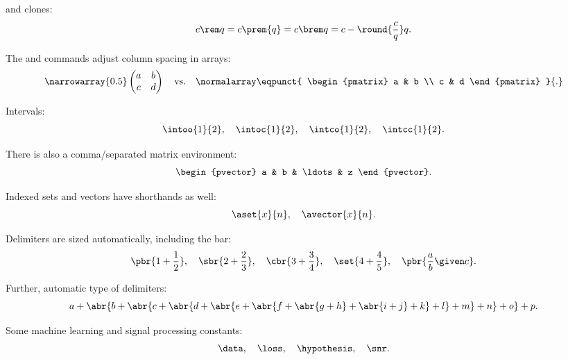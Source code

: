 \noindent
and \latexinline{\mod} clones:
\begin{equation*}
  c \rem q = c \prem{q} = c \brem q = c - \round{\frac{c}{q}}q.
\end{equation*}

The  and  commands adjust column spacing in arrays:
\begin{equation*}
  \narrowarray{0.5}
  \begin{pmatrix}
    a & b \\
    c & d
  \end{pmatrix}
  \quad \text{vs.} \quad
  \normalarray
  \eqpunct{
    \begin{pmatrix}
      a & b \\
      c & d
    \end{pmatrix}
  }{.}
\end{equation*}

Intervals:
\begin{equation*}
  \intoo{1}{2},
  \quad \intoc{1}{2},
  \quad \intco{1}{2},
  \quad \intcc{1}{2}.
\end{equation*}

\noindent
There is also a comma\-/separated matrix environment:
\begin{equation*}
  \begin{pvector}
    a & b & \ldots & z
  \end{pvector}.
\end{equation*}

\noindent
Indexed sets and vectors have shorthands as well:
\begin{equation*}
  \aset{x}{n},
  \quad \avector{x}{n}.
\end{equation*}

\noindent
Delimiters are sized automatically, including the \latexinline{\given} bar:
\begin{equation*}
  \pbr{1 + \frac{1}{2}},
  \quad \sbr{2 + \frac{2}{3}},
  \quad \cbr{3 + \frac{3}{4}},
  \quad \set{4 + \frac{4}{5}},
  \quad \pbr{\frac{a}{b} \given c}.
\end{equation*}

\noindent
Further, automatic type of delimiters:
\begin{equation*}
  a + \abr{b + \abr{c + \abr{d + \abr{e + \abr{f + \abr{g + h} + \abr{i + j} + k} + l} + m} + n} + o} + p.
\end{equation*}

Some machine learning and signal processing constants:
\begin{equation*}
  \data,
  \quad \loss,
  \quad \hypothesis,
  \quad \snr.
\end{equation*}

